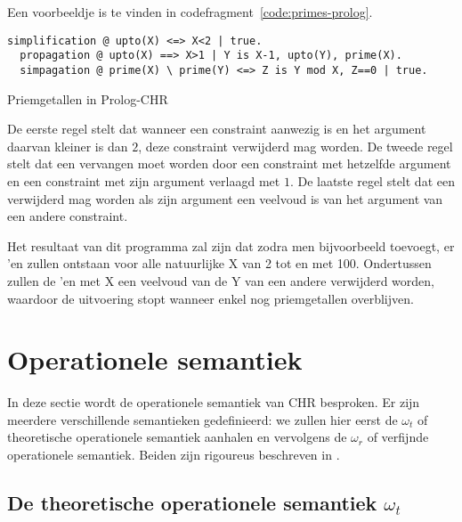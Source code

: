 Een voorbeeldje is te vinden in codefragment~\ref{code:primes-prolog}.
\begin{exCode}[bp]
\begin{Verbatim}[frame=single]
  simplification @ upto(X) <=> X<2 | true.
  propagation @ upto(X) ==> X>1 | Y is X-1, upto(Y), prime(X).
  simpagation @ prime(X) \ prime(Y) <=> Z is Y mod X, Z==0 | true.
\end{Verbatim}
\caption{Priemgetallen in Prolog-CHR}
\label{code:primes-prolog}
\end{exCode}
De eerste regel stelt dat wanneer een  constraint aanwezig is en het argument daarvan kleiner is dan $2$, deze constraint verwijderd mag worden. De tweede regel stelt dat een  vervangen moet worden door een  constraint met hetzelfde argument en een  constraint met zijn argument verlaagd met $1$. De laatste regel stelt dat een  verwijderd mag worden als zijn argument een veelvoud is van het argument van een andere  constraint.

Het resultaat van dit programma zal zijn dat zodra men bijvoorbeeld  toevoegt, er 'en zullen ontstaan voor alle natuurlijke X van 2 tot en met 100. Ondertussen zullen de 'en met X een veelvoud van de Y van een andere  verwijderd worden, waardoor de uitvoering stopt wanneer enkel nog priemgetallen overblijven.

\section{Operationele semantiek}

In deze sectie wordt de operationele semantiek van CHR besproken. Er zijn meerdere verschillende semantieken gedefinieerd: we zullen hier eerst de $\omega_t$ of theoretische operationele semantiek aanhalen en vervolgens de $\omega_r$ of verfijnde operationele semantiek. Beiden zijn rigoureus beschreven in \cite{refined}.

\subsection{De theoretische operationele semantiek $\omega_t$} \label{sec:omegat}

